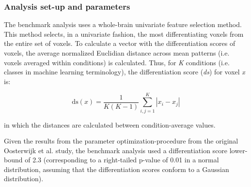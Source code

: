 \documentclass[jou,12pt,a4paper]{apa6}
\begin{document}
\subsubsection{Analysis set-up and parameters}
\noindent The benchmark analysis uses a whole-brain univariate feature selection method. This method selects, in a univariate fashion, the most differentiating voxels from the entire set of voxels. To calculate a vector with the differentiation scores of voxels, the average normalized Euclidian distance across mean patterns (i.e. voxels averaged within conditions) is calculated. Thus, for \emph{K} conditions (i.e. classes in machine learning terminology), the differentiation score (\emph{ds}) for voxel \emph{x} is:

\[ \text{ds}(x) = \frac{1}{K(K-1)} \sum_{i,j=1}^{K}\left | x_{i}-x_{j}\right | \]

\noindent in which the distances are calculated between condition-average values. 

Given the results from the parameter optimization-procedure from the original Oosterwijk et al. study, the benchmark analysis used a differentiation score lower-bound of 2.3 (corresponding to a right-tailed p-value of 0.01 in a normal distribution, assuming that the differentiation scores conform to a Gaussian distribution).
\end{document}
